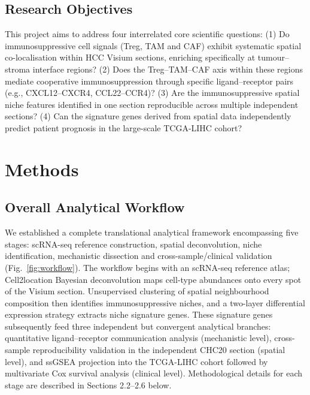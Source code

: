 \documentclass[12pt, a4paper]{article}
\begin{document}
\subsection{Research Objectives}

This project aims to address four interrelated core scientific questions:
(1) Do immunosuppressive cell signals (Treg, TAM and CAF) exhibit systematic spatial co-localisation within HCC Visium sections, enriching specifically at tumour--stroma interface regions?
(2) Does the Treg--TAM--CAF axis within these regions mediate cooperative immunosuppression through specific ligand--receptor pairs (e.g., CXCL12--CXCR4, CCL22--CCR4)?
(3) Are the immunosuppressive spatial niche features identified in one section reproducible across multiple independent sections?
(4) Can the signature genes derived from spatial data independently predict patient prognosis in the large-scale TCGA-LIHC cohort?


\section{Methods}

\subsection{Overall Analytical Workflow}

We established a complete translational analytical framework encompassing five stages: scRNA-seq reference construction, spatial deconvolution, niche identification, mechanistic dissection and cross-sample/clinical validation (Fig.~\ref{fig:workflow}). The workflow begins with an scRNA-seq reference atlas; Cell2location Bayesian deconvolution maps cell-type abundances onto every spot of the Visium section. Unsupervised clustering of spatial neighbourhood composition then identifies immunosuppressive niches, and a two-layer differential expression strategy extracts niche signature genes. These signature genes subsequently feed three independent but convergent analytical branches: quantitative ligand--receptor communication analysis (mechanistic level), cross-sample reproducibility validation in the independent CHC20 section (spatial level), and ssGSEA projection into the TCGA-LIHC cohort followed by multivariate Cox survival analysis (clinical level). Methodological details for each stage are described in Sections 2.2--2.6 below.
\end{document}
